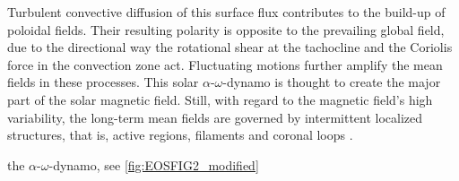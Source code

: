 Turbulent convective diffusion of this surface flux contributes to the build-up of poloidal fields. Their resulting polarity is opposite to the prevailing global field, due to the directional way the rotational shear at the tachocline and the Coriolis force in the convection zone act. Fluctuating motions further amplify the mean fields in these processes. This solar $\alpha$-$\omega$-dynamo is thought to create the major part of the solar magnetic field. Still, with regard to the magnetic field's high variability, the long-term mean fields are governed by intermittent localized structures, that is, active regions, filaments and coronal loops \citep{Miesch2005}.	%

the $\alpha$-$\omega$-dynamo, see \autoref{fig:EOSFIG2_modified}\\
\begin{figure}[htb]
\end{figure}



